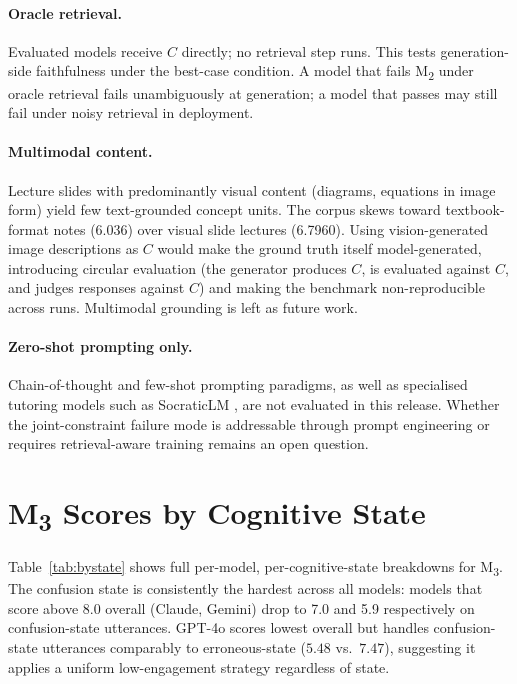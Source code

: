 \documentclass[11pt]{article}
\newcommand{\mtwo}{M\textsubscript{2}\xspace}
\newcommand{\mthree}{M\textsubscript{3}\xspace}
\begin{document}
\paragraph{Oracle retrieval.}
Evaluated models receive $C$ directly; no retrieval step runs.
This tests generation-side faithfulness under the best-case condition.
A model that fails \mtwo under oracle retrieval fails unambiguously at
generation; a model that passes may still fail under noisy retrieval in
deployment.

\paragraph{Multimodal content.}
Lecture slides with predominantly visual content (diagrams, equations in
image form) yield few text-grounded concept units.
The corpus skews toward textbook-format notes (6.036) over visual slide
lectures (6.7960).
Using vision-generated image descriptions as $C$ would make the ground
truth itself model-generated, introducing circular evaluation (the generator
produces $C$, is evaluated against $C$, and judges responses against $C$)
and making the benchmark non-reproducible across runs.
Multimodal grounding is left as future work.

\paragraph{Zero-shot prompting only.}
Chain-of-thought \citep{wei2022chain} and few-shot prompting paradigms, as
well as specialised tutoring models such as SocraticLM
\citep{liuj2024socraticlm}, are not evaluated in this release.
Whether the joint-constraint failure mode is addressable through prompt
engineering or requires retrieval-aware training remains an open question.



\appendix

\section{M\textsubscript{3} Scores by Cognitive State}
\label{app:bystate}

Table~\ref{tab:bystate} shows full per-model, per-cognitive-state breakdowns
for \mthree.
The confusion state is consistently the hardest across all models: models
that score above 8.0 overall (Claude, Gemini) drop to 7.0 and 5.9
respectively on confusion-state utterances.
GPT-4o scores lowest overall but handles confusion-state utterances
comparably to erroneous-state ($5.48$ vs.\ $7.47$), suggesting it applies
a uniform low-engagement strategy regardless of state.
\end{document}
